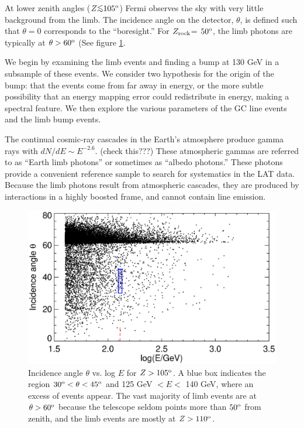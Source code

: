 \documentclass[aps,twocolumn,prd,superscriptaddress,showpacs,nofootinbib,fixfloat]{revtex4}
\newcommand{\degree}{^{\rm o}}
\newcommand{\zrock}{$Z_{\rm rock}$}
\def\la{\vcenter{\hbox{$<$}\offinterlineskip\hbox{$\sim$}}}
\begin{document}
At lower zenith angles ($Z \la 105\degree$) Fermi observes the sky with very
little background from the limb.  The incidence angle on the detector,
$\theta$, is defined such that $\theta=0$ corresponds to the ``boresight.''
For \zrock = $50\degree$, the limb photons are typically at $\theta >
60\degree$ (See figure \ref{fig:theta-E}.

We begin by examining the limb events and finding a bump at 130 GeV in a
subsample of these events.  We consider two hypothesis for the origin of the
bump: that the events come from far away in energy, or the more subtle
possibility that an energy mapping error could redistribute in energy, making
a spectral feature.  We then explore the various parameters of the GC line
events and the limb bump events. 

The continual cosmic-ray cascades in the Earth's atmosphere produce gamma rays
with $dN/dE \sim E^{-2.6}$.  (check this???)  These atmospheric gammas are
referred to as ``Earth limb photons'' or sometimes as ``albedo photons.''
These photons provide a convenient reference sample to search for systematics
in the LAT data.  Because the limb photons result from atmospheric cascades,
they are produced by interactions in a highly boosted frame, and cannot
contain line emission. 

\begin{figure}[p]
  \centering
  \includegraphics[width=1.0\linewidth]{plots/theta-E.ps}
  \caption{Incidence angle $\theta$ vs. log $E$ for $Z > 105\degree$.  A blue
  box indicates the region $30\degree < \theta < 45\degree$ and 125 GeV $< E
  <$ 140 GeV, where an excess of events appear.  The vast majority of limb
  events are at $\theta > 60\degree$ because the telescope seldom points more
  than $50\degree$ from zenith, and the limb events are mostly at
  $Z>110\degree$.}
  \label{fig:theta-E}
\end{figure}
\end{document}
